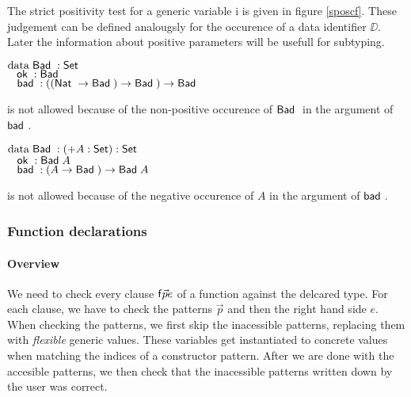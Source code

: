 The strict positivity test for a generic variable i is given in figure \ref{sposcf}.
These judgement can be defined analougsly for the occurence of a data identifier $\DD$.
Later the information about positive parameters will be usefull for subtyping.

\begin{bsp}
$\mathrm{data}\; \mathsf{Bad}\; : \mathsf{Set} $ \\
$\hspace*{3mm} \mathsf{ok}\; : \mathsf{Bad}\;$\\
$\hspace*{3mm} \mathsf{bad}\; : ((\mathsf{Nat}\; \rightarrow \mathsf{Bad}\;) \rightarrow \mathsf{Bad}\;) \rightarrow \mathsf{Bad}\;  $
\end{bsp}
is not allowed because of the non-positive occurence of $\mathsf{Bad}\;$ in the argument of $\mathsf{bad}\;$.

\begin{bsp}
$\mathrm{data}\; \mathsf{Bad}\; : ( + A : \mathsf{Set} ) : \mathsf{Set} $\\
$\hspace*{3mm} \mathsf{ok}\; : \mathsf{Bad}\; A$\\
$\hspace*{3mm} \mathsf{bad}\; : (A \rightarrow \mathsf{Bad}\;) \rightarrow \mathsf{Bad}\; A$
\end{bsp}
is not allowed because of the negative occurence of $A$ in the argument of $\mathsf{bad}\;$.

\subsubsection{Function declarations}

\newcommand\checkcl[2]{#1\mbox{ \textbf{checkcl}}#2}
\newcommand\checkp[5]{(#1)\vdash#2\mbox{ \textbf{checkp} }#3\Rightarrow (#4),#5}
\newcommand\checkps[5]{(#1)\vdash#2\mbox{ \textbf{checkps} }#3\Rightarrow (#4),#5}
\newcommand\checkinacc[2]{(#1)\vdash\mbox{ \textbf{checkinaccs} }#2}
\newcommand\inst[5]{#1,#2\vdash#3\mbox{ \textbf{inst} }#4\Rightarrow #5}
\newcommand\instlist[5]{#1,#2\vdash#3\mbox{ \textbf{instList} }#4\Rightarrow #5}


\paragraph*{Overview}
We need to check every clause $\mathsf{f} \vec{p} e$ of a function against the delcared type.
For each clause, we have to check the patterns $\vec{p}$ and then the right hand side $e$.
When checking the patterns, we first skip the inacessible patterns, 
replacing them with \emph{flexible} generic values.
These variables get instantiated to concrete values when matching
the indices of a constructor pattern.
After we are done with the accesible patterns, 
we then check that the inacessible patterns written down 
by the user was correct.
\newcommand{\subst}[2]{#1\{#2\}}
\newcommand{\substClos}[2]{#1\{#2\}}
\newcommand{\substEnv}[2]{#1\{#2\}}
\newcommand{\compS}[2]{\mathrm{compS}#1\;#2}


